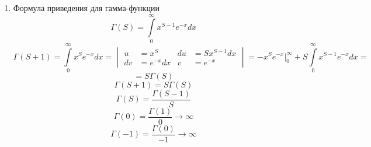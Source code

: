 \documentclass[12pt]{article}
\let\oldint\int
\let\oldlim\lim
\renewcommand{\int}{\oldint\limits}
\renewcommand{\lim}{\oldlim\limits}
\begin{document}
\begin{enumerate}
\begin{adjustwidth}{1.5em}{1.5em}
          Докажем, что $\Gamma'(S)$ сходится.\\
          Рассмотрим
          \begin{gather*}
              \int_{0}^{1}x^{S-1}\ln(x)dx = \begin{vmatrix*}
                  u &= ln(x) & du &= \frac{dx}{x} \\
                  dv &= x^{S-1}dx & v &= \frac{x^S}{S}
              \end{vmatrix*}
              = \ln (x) \frac{x^S}{S}\Big|^1_0 - \frac{1}{S}\int_{0}^{1}x^{S-1}dx =\\
              = \lim_{\varepsilon \to 0} \Big[ - \underset{= 0}{\frac{\ln (\varepsilon) \varepsilon^{S}}{S}} + 0 \Big] - \frac{1}{S^2}x^S\Big|^1_0 = -\frac{1}{S^2} \text{ сх. при }S>0
          \end{gather*}
          Рассмотрим $\lim_{x \to 0}\frac{e^{-x}x^{S-1}\ln (x)}{x^{S-1}ln(x)} = 1 \implies \int_{0}^{1}e^{-x}x^{S-1}\ln(x)dx$ сх. при $S > 0$.\\
          Рассмотрим $\int_{1}^{\infty}\frac{dx}{x^2}$ сх.\\
          Рассмотрим
          \[ \lim_{x \to \infty} \frac{e^{-x}x^{S-1}\ln x}{\frac{1}{x^2}} = \lim_{x \to \infty} \frac{x^{S+1}\ln (x)}{e^x} \overset{\text{пр. Лап.}}{=} \dots = 0 \implies \int_{1}^{\infty}e^{-x}x^{S-1}\ln(x) dx \text{ сх. при }\forall S \]
          \underline{Итог:} $\int_{0}^{\infty}e^{-x}x^{S-1}\ln(x)dx$ сх. при $S > 0$.
      \end{adjustwidth}
      \item Формула приведения для гамма-функции
      \[ \Gamma(S) = \int_{0}^{\infty}x^{S-1}e^{-x}dx \]
      \[ \Gamma(S+1) = \int_{0}^{\infty}x^S e^{-x} dx = \begin{vmatrix*}
          u &= x^S & du &= Sx^{S-1}dx\\
          dv &= e^{-x}dx & v &= e^{-x}
      \end{vmatrix*} = -x^S e^{-x}\Big|^\infty_0 + S\int_{0}^{\infty}x^{S-1}e^{-x}dx = \]
      \[ = S\Gamma(S) \]
      \[ \boxed{\Gamma(S+1) = S\Gamma(S)} \]
      \[ \boxed{\Gamma(S)=\frac{\Gamma(S-1)}{S}}\]
      \[ \boxed{\Gamma(0)=\frac{\Gamma(1)}{0} \rightarrow \infty}\]
      \[ \boxed{\Gamma(-1)=\frac{\Gamma(0)}{-1} \rightarrow \infty}\]
    \end{enumerate}
\end{document}
